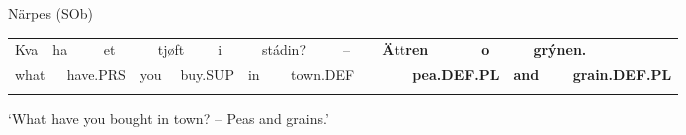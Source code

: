 \begin{listWWNumileveli}
\item 

\begin{styleExample}
Närpes (SOb)

\end{styleExample}

\end{listWWNumileveli}

\begin{tabular}{llllllllllllllllllll}
\lsptoprule
Kva & \multicolumn{2}{l}{ha

} & \multicolumn{2}{l}{et

} & \multicolumn{2}{l}{tjøft

} & \multicolumn{2}{l}{i

} & \multicolumn{2}{l}{stádin?

} & \multicolumn{2}{l}{–

} & \multicolumn{2}{l}{\textbf{Ä}tt\textbf{ren}

} & \multicolumn{2}{l}{{\bfseries o}

} & \multicolumn{2}{l}{{\bfseries grýnen.}

} & \\
\multicolumn{2}{l}{what

} & \multicolumn{2}{l}{have.PRS

} & \multicolumn{2}{l}{you

} & \multicolumn{2}{l}{buy.SUP

} & \multicolumn{2}{l}{in

} & \multicolumn{2}{l}{town.DEF

} & \multicolumn{2}{l}{} & \multicolumn{2}{l}{{\bfseries pea.DEF.PL}

} & \multicolumn{2}{l}{{\bfseries and}

} & \multicolumn{2}{l}{{\bfseries grain.DEF.PL}

}\\
\lspbottomrule
\end{tabular}

\begin{styleTranslation}
‘What have you bought in town? – Peas and grains.’

\end{styleTranslation}

